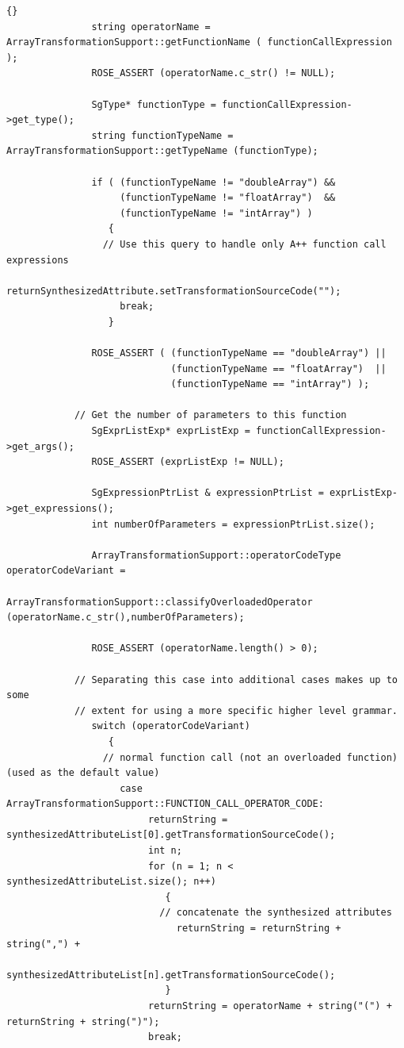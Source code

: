 \documentclass[10pt]{article}
\begin{document}
{\begin{lstlisting}{}
               string operatorName = ArrayTransformationSupport::getFunctionName ( functionCallExpression );
               ROSE_ASSERT (operatorName.c_str() != NULL);

               SgType* functionType = functionCallExpression->get_type();
               string functionTypeName = ArrayTransformationSupport::getTypeName (functionType);

               if ( (functionTypeName != "doubleArray") && 
                    (functionTypeName != "floatArray")  &&
                    (functionTypeName != "intArray") )
                  {
                 // Use this query to handle only A++ function call expressions
                    returnSynthesizedAttribute.setTransformationSourceCode("");
                    break;
                  }

               ROSE_ASSERT ( (functionTypeName == "doubleArray") || 
                             (functionTypeName == "floatArray")  ||
                             (functionTypeName == "intArray") );

            // Get the number of parameters to this function
               SgExprListExp* exprListExp = functionCallExpression->get_args();
               ROSE_ASSERT (exprListExp != NULL);

               SgExpressionPtrList & expressionPtrList = exprListExp->get_expressions();
               int numberOfParameters = expressionPtrList.size();

               ArrayTransformationSupport::operatorCodeType operatorCodeVariant =
                    ArrayTransformationSupport::classifyOverloadedOperator (operatorName.c_str(),numberOfParameters);

               ROSE_ASSERT (operatorName.length() > 0);

            // Separating this case into additional cases makes up to some 
            // extent for using a more specific higher level grammar.
               switch (operatorCodeVariant)
                  {
                 // normal function call (not an overloaded function) (used as the default value)
                    case ArrayTransformationSupport::FUNCTION_CALL_OPERATOR_CODE:
                         returnString = synthesizedAttributeList[0].getTransformationSourceCode();
                         int n;
                         for (n = 1; n < synthesizedAttributeList.size(); n++)
                            {
                           // concatenate the synthesized attributes
                              returnString = returnString + string(",") +
                                             synthesizedAttributeList[n].getTransformationSourceCode();
                            }
                         returnString = operatorName + string("(") + returnString + string(")");
                         break;


\end{lstlisting}}
\end{document}
